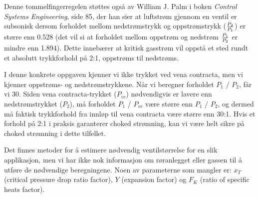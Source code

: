 Denne tommelfingerregelen støttes også av William J. Palm i boken {\it Control Systems Engineering}, side 85, der han sier at luftstrøm gjennom en ventil er subsonisk dersom forholdet mellom nedstrømstrykk og oppstrømstrykk ($P_2 \over P_1$) er større enn 0.528 (det vil si at forholdet mellom oppstrøm og nedstrøm $P_1 \over P_2$ er mindre enn 1.894). Dette innebærer at kritisk gasstrøm vil oppstå et sted rundt et absolutt trykkforhold på 2:1, oppstrøms til nedstrøms.

\vskip 10pt

I denne konkrete oppgaven kjenner vi ikke trykket ved vena contracta, men vi kjenner oppstrøms- og nedstrømstrykkene. Når vi beregner forholdet $P_1$ / $P_2$, får vi 30. Siden vena contracta-trykket ($P_{vc}$) nødvendigvis er lavere enn nedstrømstrykket ($P_{2}$), må forholdet $P_1$ / $P_{vc}$ være større enn $P_1$ / $P_2$, og dermed må faktisk trykkforhold fra innløp til vena contracta være større enn 30:1. Hvis et forhold på 2:1 i praksis garanterer choked strømning, kan vi være helt sikre på choked strømning i dette tilfellet.

\vskip 10pt

Det finnes metoder for å estimere nødvendig ventilstørrelse for en slik applikasjon, men vi har ikke nok informasjon om røranlegget eller gassen til å utføre de nødvendige beregningene. Noen av parameterne som mangler er: $x_T$ (critical pressure drop ratio factor), $Y$ (expansion factor) og $F_K$ (ratio of specific heats factor).



